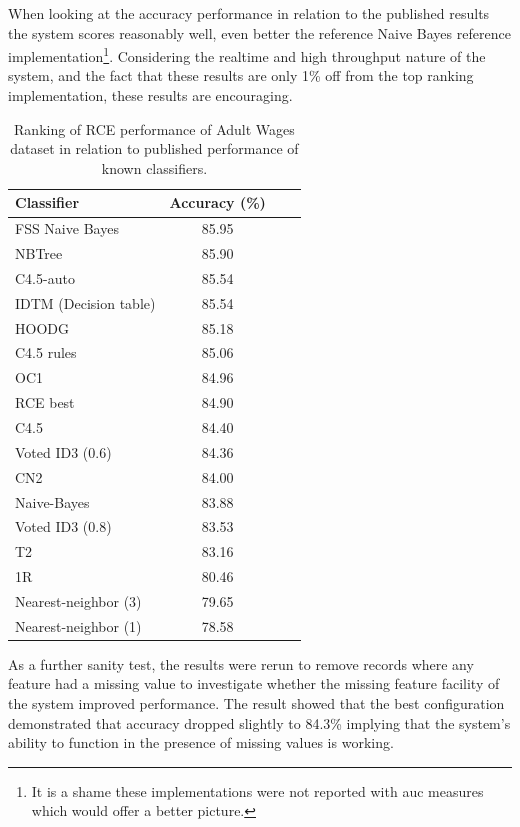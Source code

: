 \documentclass[a4paper,11pt]{scrreprt}
\begin{document}
When looking at the accuracy performance in relation to the published results the system scores reasonably well, even better the reference Naive Bayes reference implementation\footnote{It is a shame these implementations were not reported with \acrshort{auc} measures which would offer a better picture.}. Considering the realtime and high throughput nature of the system, and the fact that these results are only 1\% off from the top ranking implementation, these results are encouraging.

\begin{table}[h!]
\begin{tabular}{l*{2}{c}r}
Classifier & Accuracy (\%)\\
\hline

FSS Naive Bayes & 85.95 \\
NBTree & 85.90 \\
C4.5-auto & 85.54 \\
IDTM (Decision table) & 85.54 \\
HOODG & 85.18 \\
C4.5 rules & 85.06 \\
OC1 & 84.96 \\
\rowcolor{red!25} RCE best & 84.90 \\
C4.5 & 84.40 \\
Voted ID3 (0.6) & 84.36 \\
CN2 & 84.00 \\
Naive-Bayes & 83.88 \\
Voted ID3 (0.8) & 83.53 \\
T2 & 83.16 \\
1R & 80.46 \\
Nearest-neighbor (3) & 79.65 \\
Nearest-neighbor (1) & 78.58

\end{tabular}
\caption{Ranking of RCE performance of Adult Wages dataset in relation to published performance of known classifiers.}
\label{tab:classiferrank}
\end{table}
As a further sanity test, the results were rerun to remove records where any feature had a missing value to investigate whether the missing feature facility of the system improved performance. The result showed that the best configuration demonstrated that accuracy dropped slightly to 84.3\% implying that the system's ability to function in the presence of missing values is working.
\clearpage
\end{document}
